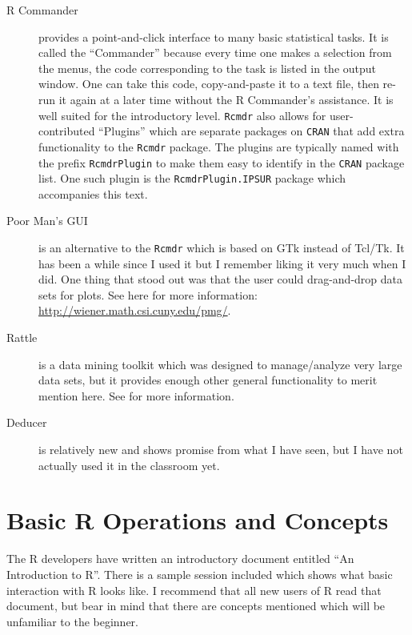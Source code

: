 \documentclass[captions=tableheading]{scrbook}
\begin{document}
\begin{description}
\item[\textsf{R} Commander] provides a point-and-click interface to many basic statistical tasks. It is called the ``Commander'' because every time one makes a selection from the menus, the code corresponding to the task is listed in the output window. One can take this code, copy-and-paste it to a text file, then re-run it again at a later time without the \textsf{R} Commander's assistance. It is well suited for the introductory level. \texttt{Rcmdr} also allows for user-contributed ``Plugins'' which are separate packages on \texttt{CRAN} that add extra functionality to the \texttt{Rcmdr} package. The plugins are typically named with the prefix \texttt{RcmdrPlugin} to make them easy to identify in the \texttt{CRAN} package list. One such plugin is the \texttt{RcmdrPlugin.IPSUR} package which accompanies this text.
\item[Poor Man's GUI] is an alternative to the \texttt{Rcmdr} which is based on GTk instead of Tcl/Tk. It has been a while since I used it but I remember liking it very much when I did. One thing that stood out was that the user could drag-and-drop data sets for plots. See here for more information: \href{http://wiener.math.csi.cuny.edu/pmg/}{http://wiener.math.csi.cuny.edu/pmg/}.
\item[Rattle] is a data mining toolkit which was designed to manage/analyze very large data sets, but it provides enough other general functionality to merit mention here. See \cite{rattle} for more information.
\item[Deducer] is relatively new and shows promise from what I have seen, but I have not actually used it in the classroom yet.
\end{description}
\section{Basic \textsf{R} Operations and Concepts}
\label{sec-2-3}

\label{sec:Basic-R-Operations}

The \textsf{R} developers have written an introductory document entitled ``An Introduction to \textsf{R}''. There is a sample session included which shows what basic interaction with \textsf{R} looks like. I recommend that all new users of \textsf{R} read that document, but bear in mind that there are concepts mentioned which will be unfamiliar to the beginner.
\end{document}
